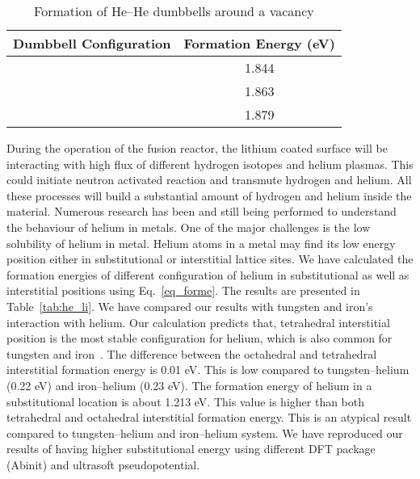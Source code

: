 \begin{table}
\caption[He--He dummbbell formation energy in lithium]{Formation of  He--He dumbbells around a vacancy}
\label{tab:hedmble}
\centering
\begin{tabular}{c c} \toprule
Dumbbell Configuration & Formation Energy (eV) \\ \midrule
{}   & 1.844 \\ \hline
{}   & 1.863  \\ \hline
{}   & 1.879 \\ 
\bottomrule
\end{tabular}
\end{table}

During the operation of the fusion reactor, the lithium coated surface will be interacting with high flux of different hydrogen isotopes and helium plasmas. This could initiate neutron activated reaction and transmute hydrogen and helium. All these processes will build a substantial amount of hydrogen and helium inside the material. Numerous research has been and still being performed to understand the behaviour of helium in metals. One of the major challenges is the low solubility of helium in metal. Helium atoms in a metal may find its low energy position either in substitutional or interstitial lattice sites. We have calculated the formation energies of different configuration of helium in substitutional as well as interstitial positions using Eq.~\eqref{eq_forme}. The results are presented in Table~\ref{tab:he_li}. We have compared our results with tungsten and iron's interaction with helium. Our calculation predicts that, tetrahedral interstitial position is the most stable configuration for helium, which is also common for tungsten and iron~\cite{becquart2007ab,fu2005}. The difference between the octahedral and tetrahedral interstitial formation energy is 0.01 eV. This is low compared to tungsten--helium (0.22 eV) and iron--helium (0.23 eV). The formation energy of helium in a substitutional location is about 1.213 eV. This value is higher than both tetrahedral and octahedral interstitial formation energy. This is an atypical result compared to tungsten--helium and iron--helium system. We have reproduced our results of having higher substitutional energy using different DFT package (\ie\@ Abinit) and ultrasoft pseudopotential. 

